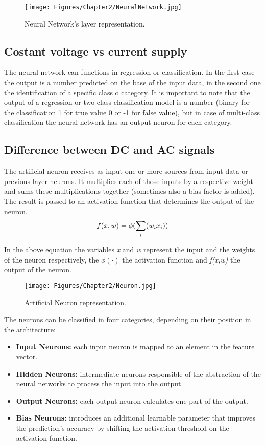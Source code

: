 \begin{figure}[th]
    \centering
    \texttt{[image: Figures/Chapter2/NeuralNetwork.jpg]}
    \caption[Neural Network]{Neural Network's layer representation.}
    \label{fig:NeuralNetwork}
\end{figure}

\subsection{Costant voltage vs current supply}
The neural network can functions in regression or classification. In the first case the output is a number predicted on the base of the input data, in the second one the identification of a specific class o category. It is important to note that the output of a regression or two-class classification model is a number (binary for the classification 1 for true value 0 or -1 for false value), but in case of multi-class classification the neural network has an output neuron for each category. 

\subsection{Difference between DC and AC signals}
The artificial neuron receives as input one or more sources from input data or previous layer neurons. It multiplies each of those inputs by a respective weight and sums these multiplications together (sometimes also a bias factor is added). The result is passed to an activation function that determines the output of the neuron.\\
\begin{equation}
    f(x,w) = \phi(\sum_i(w_i\*x_i))
\end{equation}

In the above equation the variables \textit{x} and \textit{w} represent the input and the weights of the neuron respectively, the \(\phi(\cdot)\) the activation function and \textit{f(x,w)} the output of the neuron.

\begin{figure}[th]
    \centering
    \texttt{[image: Figures/Chapter2/Neuron.jpg]}
    \caption[Neuron]{Artificial Neuron representation.}
    \label{fig:Neuron}
\end{figure}

The neurons can be classified in four categories, depending on their position in the architecture:
\begin{itemize}
    \item\textbf{Input Neurons:} each input neuron is mapped to an element in the feature vector.
    \item\textbf{Hidden Neurons:} intermediate neurons responsible of the abstraction of the neural networks to process the input into the output.
    \item\textbf{Output Neurons:} each output neuron calculates one part of the output.
    \item\textbf{Bias Neurons:} introduces an additional learnable parameter that improves the prediction's accuracy by shifting the activation threshold on the activation function.
\end{itemize}


